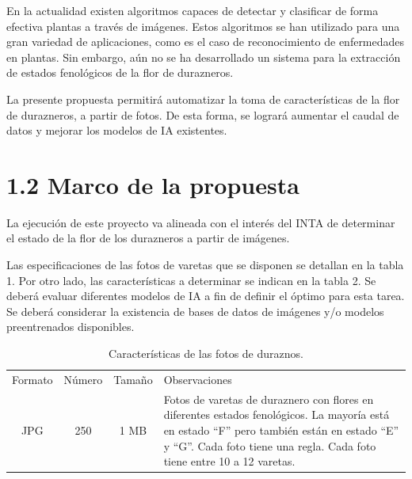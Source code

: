 \documentclass[
11pt, %
codirector, %
]{charter}
\begin{document}
En la actualidad existen algoritmos capaces de detectar y clasificar de forma efectiva plantas a través de imágenes. Estos algoritmos se han utilizado para una gran variedad de aplicaciones, como es el caso de reconocimiento de enfermedades en plantas. Sin embargo, aún no se ha desarrollado un sistema para la extracción de estados fenológicos de la flor de durazneros.

La presente propuesta permitirá automatizar la toma de características de la flor de durazneros, a partir de fotos. De esta forma, se logrará aumentar el caudal de datos y mejorar los modelos de IA existentes.

\section{1.2 Marco de la propuesta}
\label{sec:descripcion}

La ejecución de este proyecto va alineada con el interés del INTA de determinar el estado de la flor de los durazneros a partir de imágenes.

Las especificaciones de las fotos de varetas que se disponen se detallan en la tabla 1. Por otro lado, las características a determinar se indican en la tabla 2. Se deberá evaluar diferentes modelos de IA a fin de definir el óptimo para esta tarea. Se deberá considerar la existencia de bases de datos de imágenes y/o modelos preentrenados disponibles.

\renewcommand{\tablename}{Tabla}
\begin{table}[ht]
\begin{center}
\begin{tabularx}{\textwidth}{| c | c | c | X | }
\hline
\rowcolor[HTML]{C0C0C0}
\multicolumn{4}{ |c| }{Características de las fotos de duraznos} \\ \hline
Formato & Número & Tamaño & Observaciones \\ \hline
JPG     & 250    & 1 MB   & Fotos de varetas de duraznero con flores en           diferentes estados fenológicos. La mayoría está en estado “F” pero también están en estado “E” y “G”. Cada foto tiene una regla. Cada foto tiene entre 10 a 12 varetas. \\ \hline
\end{tabularx}
\caption{Características de las fotos de duraznos.}
\label{tab:coches}
\end{center}
\end{table}
\end{document}
